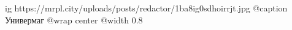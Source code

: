 
 
 
 
 

\ifcmt
  ig https://mrpl.city/uploads/posts/redactor/1ba8ig0sdhoirrjt.jpg
	@caption Универмаг
  @wrap center
  @width 0.8
\fi
